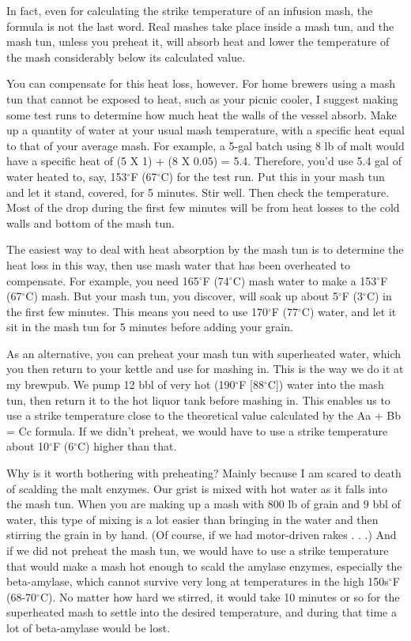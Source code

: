 \documentclass[letterpaper,12pt]{article}
\begin{document}
In fact, even for calculating the strike temperature of an infusion mash, the formula is not the last word. Real mashes take place inside a mash tun, and the mash tun, unless you preheat it, will absorb heat and lower the temperature of the mash considerably below its calculated value.

You can compensate for this heat loss, however. For home brewers using a mash tun that cannot be exposed to heat, such as your picnic cooler, I suggest making some test runs to determine how much heat the walls of the vessel absorb. Make up a quantity of water at your usual mash temperature, with a specific heat equal to that of your average mash. For example, a 5-gal batch using 8 lb of malt would have a specific heat of (5 X 1) + (8 X 0.05) = 5.4. Therefore, you'd use 5.4 gal of water heated to, say, 153$^\circ$F (67$^\circ$C) for the test run. Put this in your mash tun and let it stand, covered, for 5 minutes. Stir well. Then check the temperature. Most of the drop during the first few minutes will be from heat losses to the cold walls and bottom of the mash tun.

The easiest way to deal with heat absorption by the mash tun is to determine the heat loss in this way, then use mash water that has been overheated to compensate. For example, you need 165$^\circ$F (74$^\circ$C) mash water to make a 153$^\circ$F (67$^\circ$C) mash. But your mash tun, you discover, will soak up about 5$^\circ$F (3$^\circ$C) in the first few minutes. This means you need to use 170$^\circ$F (77$^\circ$C) water, and let it sit in the mash tun for 5 minutes before adding your grain.

As an alternative, you can preheat your mash tun with superheated water, which you then return to your kettle and use for mashing in. This is the way we do it at my brewpub. We pump 12 bbl of very hot (190$^\circ$F [88$^\circ$C]) water into the mash tun, then return it to the hot liquor tank before mashing in. This enables us to use a strike temperature close to the theoretical value calculated by the Aa + Bb = Cc formula. If we didn't preheat, we would have to use a strike temperature about 10$^\circ$F (6$^\circ$C) higher than that.

Why is it worth bothering with preheating? Mainly because I am scared to death of scalding the malt enzymes. Our grist is mixed with hot water as it falls into the mash tun. When you are making up a mash with 800 lb of grain and 9 bbl of water, this type of mixing is a lot easier than bringing in the water and then stirring the grain in by hand. (Of course, if we had motor-driven rakes . . .) And if we did not preheat the mash tun, we would have to use a strike temperature that would make a mash hot enough to scald the amylase enzymes, especially the beta-amylase, which cannot survive very long at temperatures in the high 150s$^\circ$F (68-70$^\circ$C). No matter how hard we stirred, it would take 10 minutes or so for the superheated mash to settle into the desired temperature, and during that time a lot of beta-amylase would be lost.
\end{document}
